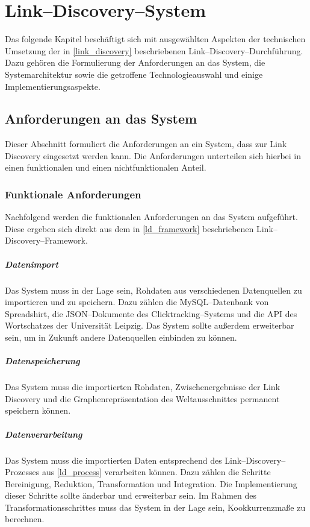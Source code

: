 \chapter{Link--Discovery--System}
\label{system}

Das folgende Kapitel beschäftigt sich mit ausgewählten Aspekten der technischen Umsetzung der in \cref{link_discovery} beschriebenen Link--Discovery--Durchführung. Dazu gehören die Formulierung der Anforderungen an das System, die Systemarchitektur sowie die getroffene Technologieauswahl und einige Implementierungsaspekte.

\section{Anforderungen an das System}
\label{requirements}

Dieser Abschnitt formuliert die Anforderungen an ein System, dass zur Link Discovery eingesetzt werden kann. Die Anforderungen unterteilen sich hierbei in einen funktionalen und einen nichtfunktionalen Anteil. 

\subsection{Funktionale Anforderungen}

Nachfolgend werden die funktionalen Anforderungen an das System aufgeführt. Diese ergeben sich direkt aus dem in \cref{ld_framework} beschriebenen Link--Discovery--Framework.

\paragraph{Datenimport} Das System muss in der Lage sein, Rohdaten aus verschiedenen Datenquellen zu importieren und zu speichern. Dazu zählen die MySQL--Datenbank von Spreadshirt, die JSON--Dokumente des Clicktracking--Systems und die API des Wortschatzes der Universität Leipzig. Das System sollte außerdem erweiterbar sein, um in Zukunft andere Datenquellen einbinden zu können.

\paragraph{Datenspeicherung} Das System muss die importierten Rohdaten, Zwischenergebnisse der Link Discovery und die Graphenrepräsentation des Weltausschnittes permanent speichern können.

\paragraph{Datenverarbeitung} Das System muss die importierten Daten entsprechend des Link--Discovery--Prozesses aus \cref{ld_process} verarbeiten können. Dazu zählen die Schritte Bereinigung, Reduktion, Transformation und Integration. Die Implementierung dieser Schritte sollte änderbar und erweiterbar sein. Im Rahmen des Transformationsschrittes muss das System in der Lage sein, Kookkurrenzmaße zu berechnen.

